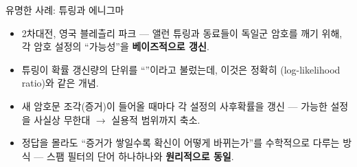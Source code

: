 \documentclass[aspectratio=169,11pt]{beamer}
\begin{document}

\begin{frame}{유명한 사례: 튜링과 에니그마}
  \begin{itemize}
    \item 2차대전, 영국 블레츨리 파크 --- 앨런 튜링과 동료들이 독일군
       암호를 깨기 위해, 각 암호 설정의 ``가능성''을
      \textbf{베이즈적으로 갱신}.
    \item 튜링이 확률 갱신량의 단위를 ``''이라고 불렀는데,
      이것은 정확히 (log-likelihood ratio)와 같은 개념.
    \item 새 암호문 조각(증거)이 들어올 때마다 각 설정의 사후확률을
      갱신 --- 가능한 설정을 사실상 무한대 $\to$ 실용적 범위까지 축소.
    \item 정답을 몰라도 ``증거가 쌓일수록 확신이 어떻게 바뀌는가''를
      수학적으로 다루는 방식 --- 스팸 필터의 단어 하나하나와
      \textbf{원리적으로 동일}.
  \end{itemize}
\end{frame}
\end{document}
